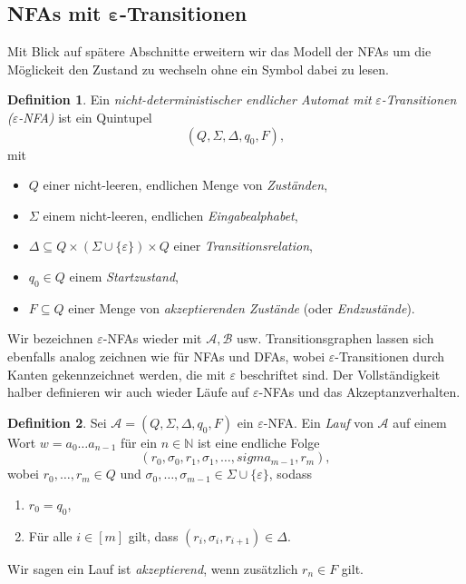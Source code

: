 \documentclass[11pt, a4paper]{article}
\theoremstyle{definition}
\newtheorem{definition}{Definition}[section]
\theoremstyle{plain}
\numberwithin{equation}{section}
\begin{document}
\subsection[NFAs mit $\varepsilon$-Transitionen]{NFAs mit $\bm{\varepsilon}$-Transitionen}
Mit Blick auf spätere Abschnitte erweitern wir das Modell der NFAs um die Möglickeit den Zustand zu wechseln ohne ein Symbol dabei zu lesen.
\begin{definition}
	Ein \textit{nicht-deterministischer endlicher Automat mit} \textit{$\varepsilon$-Transitionen ($\varepsilon$-NFA)} ist ein Quintupel
	$$
		(Q, \Sigma, \Delta, q_0, F),
	$$
	mit
	\begin{itemize}
		\item $Q$ einer nicht-leeren, endlichen Menge von \textit{Zuständen},
		\item $\Sigma$ einem nicht-leeren, endlichen \textit{Eingabealphabet},
		\item $\Delta \subseteq Q \times (\Sigma \cup \{\varepsilon\}) \times Q$ einer \textit{Transitionsrelation},
		\item $q_0 \in Q$ einem \textit{Startzustand},
		\item $F \subseteq Q$ einer Menge von \textit{akzeptierenden Zustände} (oder \textit{Endzustände}).
	\end{itemize}
\end{definition}
Wir bezeichnen $\varepsilon$-NFAs wieder mit $\mathcal{A}, \mathcal{B}$ usw. Transitionsgraphen lassen sich ebenfalls analog zeichnen wie für NFAs und DFAs, wobei $\varepsilon$-Transitionen durch Kanten gekennzeichnet werden, die mit $\varepsilon$ beschriftet sind. Der Voll\-stän\-dig\-keit halber definieren wir auch wieder Läufe auf $\varepsilon$-NFAs und das Akzeptanzverhalten.
\begin{definition}
	Sei $\mathcal{A} = (Q, \Sigma, \Delta, q_0, F)$ ein $\varepsilon$-NFA.
	Ein \textit{Lauf} von $\mathcal{A}$ auf einem Wort $w = a_0 \ldots a_{n-1}$ für ein $n \in \mathbb{N}$ ist eine endliche Folge
	$$
		(r_0, \sigma_0, r_1, \sigma_1, \ldots, sigma_{m-1}, r_m),
	$$
	wobei $r_0, \ldots, r_m \in Q$ und $\sigma_0, \ldots, \sigma_{m-1} \in \Sigma \cup \{\varepsilon\}$, sodass
	\begin{enumerate}
		\item $r_0 = q_0$,
		\item Für alle $i \in [m]$ gilt, dass $(r_i, \sigma_i, r_{i+1}) \in \Delta$.
	\end{enumerate}
	Wir sagen ein Lauf ist \textit{akzeptierend}, wenn zusätzlich $r_n \in F$ gilt.
\end{definition}
\end{document}
